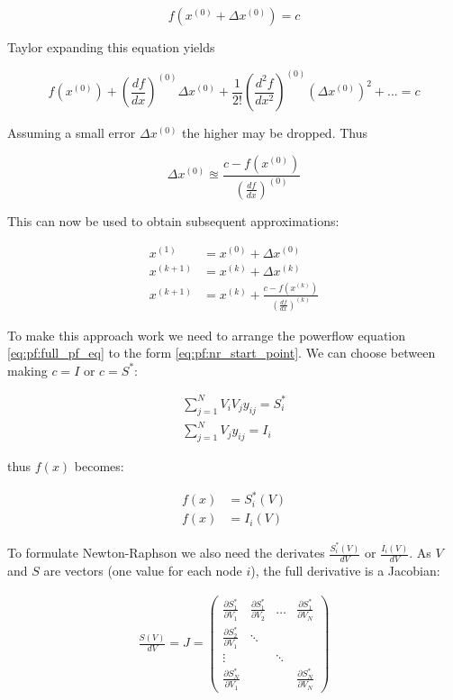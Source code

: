\begin{equation}
    f(x^{(0)} + \Delta x^{(0)}) = c
\end{equation}

Taylor expanding this equation yields

\begin{equation}
    f(x^{(0)}) + (\frac{df}{dx})^{(0)} \Delta x^{(0)} + \frac{1}{2!} (\frac{d^2f}{dx^2})^{(0)} (\Delta x^{(0)})^2 + ... = c
\end{equation}

Assuming a small error $\Delta x^{(0)}$ the higher may be dropped. Thus

\begin{equation}
    \Delta x^{(0)} \approxeq \frac{c - f(x^{(0)}) }{ (\frac{df}{dx})^{(0)} }
\end{equation}

This can now be used to obtain subsequent approximations:

\begin{align}
    x^{(1)}   &= x^{(0)} + \Delta x^{(0)}\\
    x^{(k+1)} &= x^{(k)} + \Delta x^{(k)}\\
    x^{(k+1)} &= x^{(k)} + \frac{c - f(x^{(k)}) }{ (\frac{df}{dx})^{(k)} }
    \label{eq:pf:nr_iteration}
\end{align}


To make this approach work we need to arrange the powerflow equation \ref{eq:pf:full_pf_eq}
to the form \ref{eq:pf:nr_start_point}. We can choose between making $c = I$ or 
$c = S^*$:

\begin{align}
    \sum_{j = 1}^N V_i V_j y_{ij} = S^*_i\\
    \sum_{j = 1}^N V_j y_{ij} = I_i
    \label{eq:pf:nr_pf_starting_point}
\end{align}

thus $f(x)$ becomes:

\begin{align}
    f(x) &= S^*_i(V)\\
    f(x) &= I_i(V)
\end{align}

To formulate Newton-Raphson we also need the derivates $\frac{S^*_i(V)}{dV}$ or $\frac{I_i(V)}{dV}$. As $V$ and $S$ are vectors
(one value for each node $i$), the full derivative is a Jacobian:

\begin{align}
    \frac{S(V)}{dV} = J = 
    \begin{pmatrix}
        \frac{\partial S^*_1}{\partial V_1} & \frac{\partial S^*_1}{\partial V_2} & \dots  & \frac{\partial S^*_1}{\partial V_N}\\
        \frac{\partial S^*_2}{\partial V_1} & \ddots                              &        &                                    \\
        \vdots                              &                                     & \ddots &                                    \\
        \frac{\partial S^*_N}{\partial V_1} &                                     &        & \frac{\partial S^*_N}{\partial V_N}
    \end{pmatrix}
\end{align}

